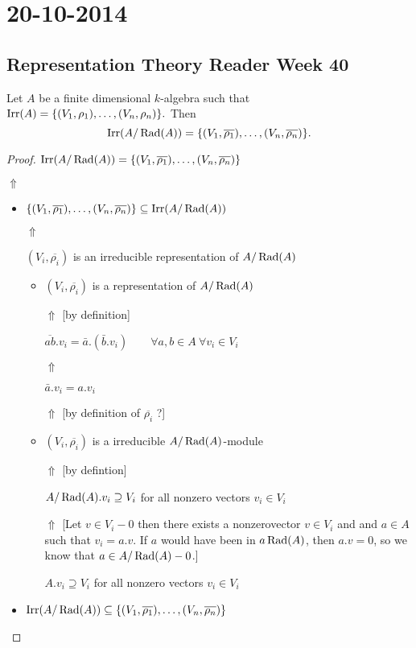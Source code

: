 \section{20-10-2014}
\subsection{Representation Theory Reader Week 40}
\begin{prop}
Let \(A\) be a finite dimensional \(k\)-algebra such that \(\operatorname{Irr}(A)=\{(V_{1},\rho _{1}),\ldots ,(V_{n},\rho _{n})\}.\) Then
\[
\operatorname{Irr}(A/\operatorname{Rad}(A))=\{(V_{1},\overline{\rho _{1}}),\ldots ,(V_{n},\overline{\rho _{n}})\}.
\]
\end{prop}

\begin{proof}
\(\operatorname{Irr}(A/\operatorname{Rad}(A))=\{(V_{1},\overline{\rho _{1}}),\ldots ,(V_{n},\overline{\rho _{n}})\}\)

\(\Uparrow \)

\begin{itemize}
  \item \(\{(V_{1},\overline{\rho _{1}}),\ldots ,(V_{n},\overline{\rho _{n}})\}\subseteq \operatorname{Irr}(A/\operatorname{Rad}(A))\)

\(\Uparrow \)

\((V_{i},\overline{\rho _{i}})\) is an irreducible representation of \(A/\operatorname{Rad}(A)\)
\begin{itemize}
  \item \((V_{i},\overline{\rho _{i}})\) is a representation of \(A/\operatorname{Rad}(A)\)

\(\Uparrow \)  [by definition]

\(\overline{ab}.v_{i}=\bar{a}.(\bar{b}.v_{i}) \qquad \forall a,b\in A\  \forall v_{i}\in V_{i}\)

\(\Uparrow \)

\(\bar{a}.v_{i}=a.v_{i}\)

\(\Uparrow \) [by definition of \(\overline{\rho _{i}}\) ?]
  \item \((V_{i},\overline{\rho _{i}})\) is a irreducible \(A/\operatorname{Rad}(A)\)-module

\(\Uparrow \) [by defintion]

\(A/\operatorname{Rad}(A).v_{i}\supseteq V_{i}\) for all nonzero vectors \(v_{i}\in V_{i}\)

\(\Uparrow \) [Let \(v\in V_{i}-0\) then there exists a nonzerovector \(v\in V_{i}\) and and \(a\in A\) such that \(v_{i}=a.v\). If \(a\) would have been in \(a\operatorname{Rad}(A)\), then \(a.v=0\), so we know that \(a\in A/\operatorname{Rad}(A)-0\).]

\(A.v_{i}\supseteq V_{i}\) for all nonzero vectors \(v_{i}\in V_{i}\)
\end{itemize}
  \item \(\operatorname{Irr}(A/\operatorname{Rad}(A))\subseteq \{(V_{1},\overline{\rho _{1}}),\ldots ,(V_{n},\overline{\rho _{n}})\}\)


\end{itemize}
\end{proof}

